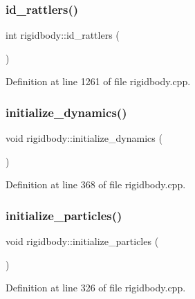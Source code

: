 \mbox{\label{classrigidbody_a69d75bd6de90bb5b9a446b8aa23741de}} 
\subsubsection{\texorpdfstring{id\+\_\+rattlers()}{id\_rattlers()}}
{\footnotesize\ttfamily int rigidbody\+::id\+\_\+rattlers (\begin{DoxyParamCaption}{ }\end{DoxyParamCaption})}



Definition at line 1261 of file rigidbody.\+cpp.

\mbox{\label{classrigidbody_a41b996f7b9d8064b3c14a2613293873c}} 
\subsubsection{\texorpdfstring{initialize\+\_\+dynamics()}{initialize\_dynamics()}}
{\footnotesize\ttfamily void rigidbody\+::initialize\+\_\+dynamics (\begin{DoxyParamCaption}{ }\end{DoxyParamCaption})}



Definition at line 368 of file rigidbody.\+cpp.

\mbox{\label{classrigidbody_a948adf54e71037640543643bbfd1a7c5}} 
\subsubsection{\texorpdfstring{initialize\+\_\+particles()}{initialize\_particles()}}
{\footnotesize\ttfamily void rigidbody\+::initialize\+\_\+particles (\begin{DoxyParamCaption}{ }\end{DoxyParamCaption})}



Definition at line 326 of file rigidbody.\+cpp.

